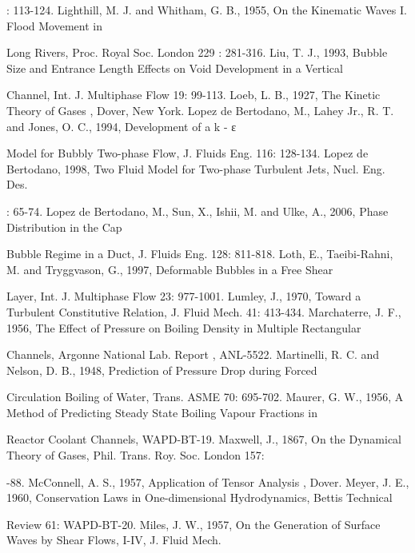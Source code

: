 \documentclass[11pt,a4paper,openany,fontset=none]{ctexbook}
\begin{document}
{\small\raggedright{}: 113-124. Lighthill, M. J. and Whitham, G. B., 1955, On the Kinematic Waves I. Flood Movement in\par}
{\small\raggedright\noindent Long Rivers, Proc. Royal Soc. London 229 : 281-316. Liu, T. J., 1993, Bubble Size and Entrance Length Effects on Void Development in a Vertical\par}
{\small\raggedright\noindent Channel, Int. J. Multiphase Flow 19: 99-113. Loeb, L. B., 1927, The Kinetic Theory of Gases , Dover, New York. Lopez de Bertodano, M., Lahey Jr., R. T. and Jones, O. C., 1994, Development of a k - ε\par}
{\small\raggedright\noindent Model for Bubbly Two-phase Flow, J. Fluids Eng. 116: 128-134. Lopez de Bertodano, 1998, Two Fluid Model for Two-phase Turbulent Jets, Nucl. Eng. Des.\par}
{\small\raggedright{}: 65-74. Lopez de Bertodano, M., Sun, X., Ishii, M. and Ulke, A., 2006, Phase Distribution in the Cap\par}
{\small\raggedright\noindent Bubble Regime in a Duct, J. Fluids Eng. 128: 811-818. Loth, E., Taeibi-Rahni, M. and Tryggvason, G., 1997, Deformable Bubbles in a Free Shear\par}
{\small\raggedright\noindent Layer, Int. J. Multiphase Flow 23: 977-1001. Lumley, J., 1970, Toward a Turbulent Constitutive Relation, J. Fluid Mech. 41: 413-434. Marchaterre, J. F., 1956, The Effect of Pressure on Boiling Density in Multiple Rectangular\par}
{\small\raggedright\noindent Channels, Argonne National Lab. Report , ANL-5522. Martinelli, R. C. and Nelson, D. B., 1948, Prediction of Pressure Drop during Forced\par}
{\small\raggedright\noindent Circulation Boiling of Water, Trans. ASME 70: 695-702. Maurer, G. W., 1956, A Method of Predicting Steady State Boiling Vapour Fractions in\par}
{\small\raggedright\noindent Reactor Coolant Channels, WAPD-BT-19. Maxwell, J., 1867, On the Dynamical Theory of Gases, Phil. Trans. Roy. Soc. London 157:\par}
{\small\raggedright{}-88. McConnell, A. S., 1957, Application of Tensor Analysis , Dover. Meyer, J. E., 1960, Conservation Laws in One-dimensional Hydrodynamics, Bettis Technical\par}
{\small\raggedright\noindent Review 61: WAPD-BT-20. Miles, J. W., 1957, On the Generation of Surface Waves by Shear Flows, I-IV, J. Fluid Mech.\par}
\end{document}

